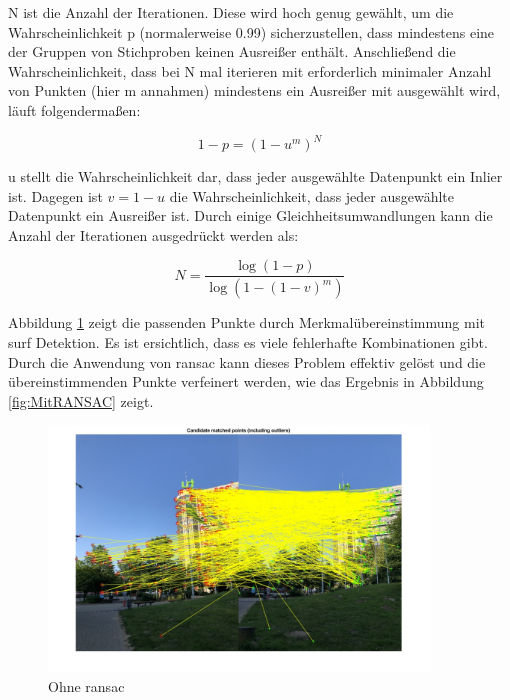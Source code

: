 N ist die Anzahl der Iterationen. Diese wird hoch genug gewählt, um die Wahrscheinlichkeit p (normalerweise 0.99) sicherzustellen, dass mindestens eine der Gruppen von Stichproben keinen Ausreißer enthält. Anschließend die Wahrscheinlichkeit, dass bei N mal iterieren mit erforderlich minimaler Anzahl von Punkten (hier m annahmen) mindestens ein Ausreißer mit ausgewählt wird, läuft folgendermaßen:

\begin{equation}
   1 - p = (1 - u^m)^N
\end{equation}

u stellt die Wahrscheinlichkeit dar, dass jeder ausgewählte Datenpunkt ein Inlier ist. Dagegen ist $v=1-u$ die Wahrscheinlichkeit, dass jeder ausgewählte Datenpunkt ein Ausreißer ist. Durch einige Gleichheitsumwandlungen kann die Anzahl der Iterationen ausgedrückt werden als:

\begin{equation}
   N = \frac{\log(1 - p)}{\log(1 - (1 - v)^m)}
\end{equation}

Abbildung \ref{fig:OhneRANSAC} zeigt die passenden Punkte durch Merkmalübereinstimmung mit \gls{surf} Detektion. Es ist ersichtlich, dass es viele fehlerhafte Kombinationen gibt. Durch die Anwendung von \gls{ransac} kann dieses Problem effektiv gelöst und die übereinstimmenden Punkte verfeinert werden, wie das Ergebnis in Abbildung \ref{fig:MitRANSAC} zeigt.

\begin{figure}[H]
 \centering 
 \includegraphics[keepaspectratio,width=0.9\textwidth]{images/3_Ersteverfahren/RANSAC/OhneRANSAC.pdf}
 \caption{Ohne \gls{ransac}}
 \label{fig:OhneRANSAC}
\end{figure} 

